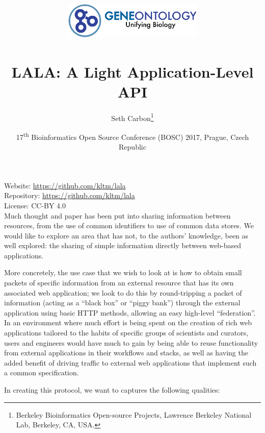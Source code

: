 \documentclass[10pt,oneside]{article}
\title{%
\vspace{-1.5in}
\includegraphics[width=0.5\textwidth,natwidth=485,natheight=125]{go-logo-small.png}\\
~\\LALA: A Light Application-Level API}
\author{
  Seth Carbon\footnote{Berkeley Bioinformatics Open-source Projects, Lawrence Berkeley National Lab, Berkeley, CA, USA.} %
}
\date{17\textsuperscript{th} Bioinformatics Open Source Conference
  (BOSC) 2017, Prague, Czech Republic}
\begin{document}
\maketitle
\thispagestyle{empty}

\vspace{-0.2in}
\noindent
Website: \url{https://github.com/kltm/lala} \\
Repository: \url{https://github.com/kltm/lala} \\
License: CC-BY 4.0 \\


Much thought and paper has been put into sharing information between
resources, from the use of common identifiers to use of common data
stores. We would like to explore an area that has not, to the authors'
knowledge, been as well explored: the sharing of simple information
directly between web-based applications.

More concretely, the use case that we wish to look at is how to obtain
small packets of specific information from an external resource that
has its own associated web application; we look to do this by
round-tripping a packet of information (acting as a ``black box'' or
``piggy bank'') through the external application using basic HTTP
methods, allowing an easy high-level ``federation''. In an environment
where much effort is being spent on the creation of rich web
applications tailored to the habits of specific groups of scientists
and curators, users and engineers would have much to gain by being
able to reuse functionality from external applications in their
workflows and stacks, as well as having the added benefit of driving
traffic to external web applications that implement such a common
specification.

In creating this protocol, we want to captures the following
qualities:

\end{document}
